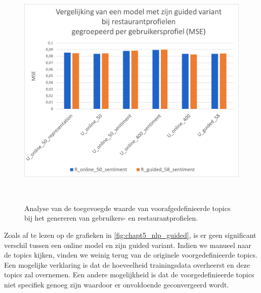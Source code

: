 \begin{figure}[H]
        \centering
        \parbox[b]{0.6\textwidth}{\includegraphics[width=\linewidth]{fig/chapt5/NLP/nlp_comparison_guided_restaurant.png}}\quad
        \parbox[b]{0.37\textwidth}{
        \label{fig:chapt5_nlp_guided_restaurant}}
        \\[.5cm]

        \caption{Analyse van de toegevoegde waarde van voorafgedefinieerde topics bij het genereren van gebruikers- en restaurantprofielen.}
        \label{fig:chapt5_nlp_guided}
\end{figure}

Zoals af te lezen op de grafieken in \autoref{fig:chapt5_nlp_guided}, is er geen significant verschil tussen een online model en zijn guided variant. Indien we manueel naar de topics kijken, vinden we weinig terug van de originele voorgedefinieerde topics. Een mogelijke verklaring is dat de hoeveelheid trainingsdata overheerst en deze topics zal overnemen. Een andere mogelijkheid is dat de voorgedefinieerde topics niet specifiek genoeg zijn waardoor er onvoldoende geconvergeerd wordt. \\

